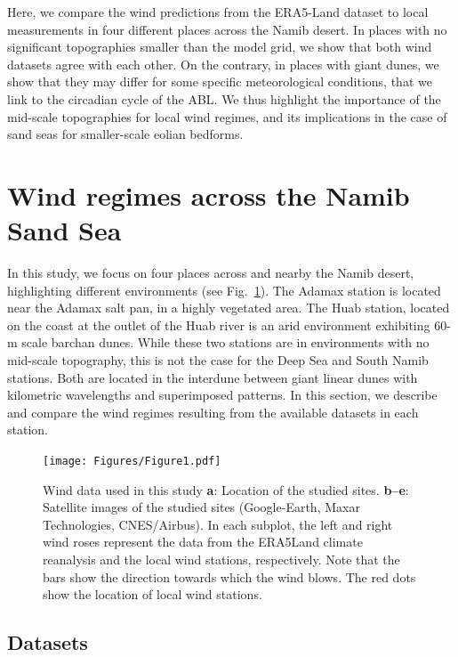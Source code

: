 Here, we compare the wind predictions from the ERA5-Land dataset to local measurements in four different places across the Namib desert. In places with no significant topographies smaller than the model grid, we show that both wind datasets agree with each other. On the contrary, in places with giant dunes, we show that they may differ for some specific meteorological conditions, that we link to the circadian cycle of the ABL. We thus highlight the importance of the mid-scale topographies for local wind regimes, and its implications in the case of sand seas for smaller-scale eolian bedforms.


\section{Wind regimes across the Namib Sand Sea}

In this study, we focus on four places across and nearby the Namib desert, highlighting different environments (see Fig.~\ref{Fig1}).
%
The Adamax station is located near the Adamax salt pan, in a highly vegetated area. The Huab station, located on the coast at the outlet of the Huab river is an arid environment exhibiting $60$-m scale barchan dunes. While these two stations are in environments with no mid-scale topography, this is not the case for the Deep Sea and South Namib stations. Both are located in the interdune between giant linear dunes with kilometric wavelengths and superimposed patterns. In this section, we describe and compare the wind regimes resulting from the available datasets in each station.

  \begin{figure}
    \centering
    \texttt{[image: Figures/Figure1.pdf]}
    \caption{Wind data used in this study \textbf{a}: Location of the studied sites. \textbf{b--e}: Satellite images of the studied sites (Google-Earth, Maxar Technologies, CNES/Airbus). In each subplot, the left and right wind roses represent the data from the ERA5Land climate reanalysis and the local wind stations, respectively. Note that the bars show the direction towards which the wind blows. The red dots show the location of local wind stations.}
    \label{Fig1}
  \end{figure}

  \subsection{Datasets}

